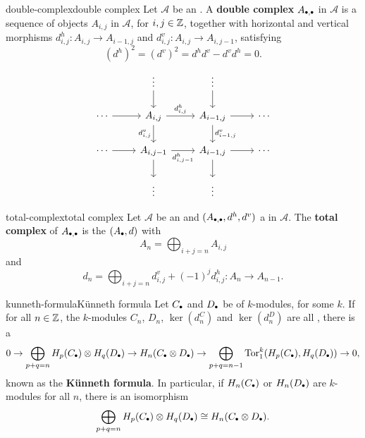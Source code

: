 \begin{topic}{double-complex}{double complex}
    Let $\mathcal{A}$ be an . A \textbf{double complex} $A_{\bdot, \bdot}$ in $\mathcal{A}$ is a sequence of objects $A_{i, j}$ in $\mathcal{A}$, for $i, j \in \mathbb{Z}$, together with horizontal and vertical morphisms $d^h_{i, j} \colon A_{i, j} \to A_{i - 1, j}$ and $d^v_{i, j} \colon A_{i, j} \to A_{i, j - 1}$, satisfying
    \[ (d^h)^2 = (d^v)^2 = d^h d^v - d^v d^h = 0 . \]
    \[ \svg \begin{tikzcd}
        & \vdots \arrow{d} & \vdots \arrow{d} & \\
        \cdots \arrow{r} & A_{i, j} \arrow{r}{d^h_{i, j}} \arrow[swap]{d}{d^v_{i, j}} & A_{i - 1, j} \arrow{r} \arrow{d}{d^v_{i - 1, j}} & \cdots \\
        \cdots \arrow{r} & A_{i, j - 1} \arrow[swap]{r}{d^h_{i, j - 1}} \arrow{d} & A_{i - 1, j} \arrow{r} \arrow{d} & \cdots \\
         & \vdots & \vdots & 
    \end{tikzcd} \]
\end{topic}

\begin{topic}{total-complex}{total complex}
    Let $\mathcal{A}$ be an  and $(A_{\bdot, \bdot}, d^h, d^v)$ a  in $\mathcal{A}$. The \textbf{total complex} of $A_{\bdot, \bdot}$ is the  $(A_\bdot, d)$ with
    \[ A_n = \bigoplus_{i + j = n} A_{i, j} \]
    and
    \[ d_n = \bigoplus_{i + j = n} d^v_{i, j} + (-1)^j d^h_{i, j} \colon A_n \to A_{n - 1} . \]
\end{topic}

\begin{topic}{kunneth-formula}{Künneth formula}
    Let $C_\bdot$ and $D_\bdot$ be  of $k$-modules, for some  $k$. If for all $n \in \mathbb{Z}$, the $k$-modules $C_n$, $D_n$, $\ker(d_n^C)$ and $\ker(d_n^D)$ are all , there is a 
    \[ 0 \to \bigoplus_{p + q = n} H_p(C_\bdot) \otimes H_q(D_\bdot) \to H_n(C_\bdot \otimes D_\bdot) \to \bigoplus_{p + q = n - 1} \textup{Tor}_1^k(H_p(C_\bdot), H_q(D_\bdot)) \to 0 , \]
    known as the \textbf{Künneth formula}. In particular, if $H_n(C_\bdot)$ or $H_n(D_\bdot)$ are  $k$-modules for all $n$, there is an isomorphism
    \[ \bigoplus_{p + q = n} H_p(C_\bdot) \otimes H_q(D_\bdot) \isom H_n(C_\bdot \otimes D_\bdot) . \]
\end{topic}

